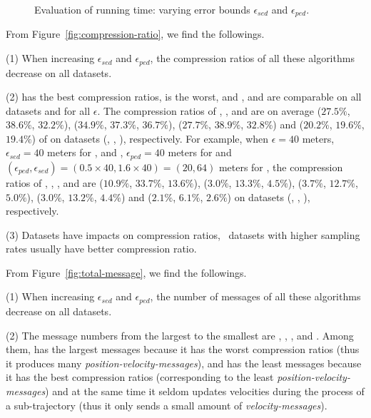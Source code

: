 {{\begin{figure}[tb!]
	\vspace{-2ex}
	\caption{\small Evaluation of running time: varying error bounds $\epsilon_{sed}$ and $\epsilon_{ped}$.}
	\label{fig:running-time}
	\vspace{-2ex}
\end{figure}


 From Figure~\ref{fig:compression-ratio}, we find the followings.

\ni (1) When increasing $\epsilon_{sed}$ and $\epsilon_{ped}$, the compression ratios of all these algorithms decrease on all datasets.

\ni (2) \sitt has the best compression ratios, \ldrh is the worst, and \grts, \citt and \bitt are comparable on all datasets and for all $\epsilon$.
The compression ratios of \grts, \bitt,  \citt and \sitt are on average {($27.5\%$, $38.6\%$, $32.2\%$), ($34.9\%$, $37.3\%$, $36.7\%$), ($27.7\%$, $38.9\%$, $32.8\%$) and ($20.2\%$, $19.6\%$, $19.4\%$)} of \ldrh on datasets (\mopsi, \sercar, \geolife), respectively.
For example, when $\epsilon = 40$ meters, \ie~$\epsilon_{sed} = 40$ meters for \ldrh, \grts and \citt, $\epsilon_{ped} = 40$ meters for \sitt and {$(\epsilon_{ped}, \epsilon_{sed}) = (0.5\times 40, 1.6\times 40)=(20, 64)$} meters for \bitt, the compression ratios of \ldrh, \grts, \bitt, \citt and \sitt are
{($10.9\%$, $33.7\%$, $13.6\%$), ($3.0\%$, $13.3\%$, $4.5\%$), {($3.7\%$, $12.7\%$, $5.0\%$)}, ($3.0\%$, $13.2\%$, $4.4\%$) and ($2.1\%$, $6.1\%$, $2.6\%$)} on  {datasets (\mopsi, \sercar, \geolife)}, respectively. 

\ni (3) Datasets have impacts on compression ratios, \ie~datasets with higher sampling rates usually have better compression ratio.
	


 From Figure~\ref{fig:total-message}, we find the followings.


\ni (1) When increasing $\epsilon_{sed}$ and $\epsilon_{ped}$, the number of messages of all these algorithms decrease on all datasets.

\ni (2) The message numbers from the largest to the smallest are \ldrh, \grts, \citt, \bitt and \sitt. Among them, \ldrh has the largest messages because it has the worst compression ratios (thus it produces many \emph{position-velocity-messages}), and \sitt has the least messages because it has the best compression ratios (corresponding to the least \emph{position-velocity-messages}) and at the same time it seldom updates velocities during the process of a sub-trajectory (thus it only sends a small amount of \emph{velocity-messages}).

}}
